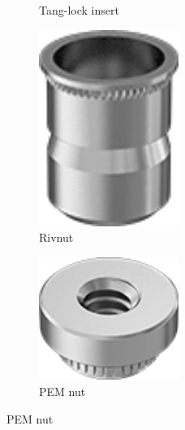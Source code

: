 \begin{figure}[H]
\begin{subfigure}[b]{.24\linewidth}
			\caption{Tang-lock insert}
		\end{subfigure}\begin{subfigure}[b]{.24\linewidth}
			\includegraphics[width=0.5\textwidth]{imgs/rivnut.png}
			\caption{Rivnut}
		\end{subfigure}\begin{subfigure}[b]{.24\linewidth}
			\includegraphics[width=0.5\textwidth]{imgs/pemnut.png}
			\caption{PEM nut}
		\end{subfigure}
		

\end{figure}
